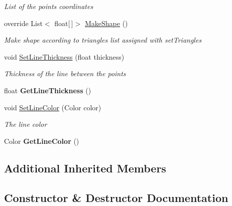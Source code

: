 \begin{DoxyCompactItemize}
\begin{DoxyCompactList}\small\item\em List of the points coordinates \end{DoxyCompactList}\item 
override List$<$ float\mbox{[}$\,$\mbox{]}$>$ \mbox{\hyperlink{class_space_v_i_l_1_1_points_container_a7fd8cf39e463780c871d538b884a3fdb}{Make\+Shape}} ()
\begin{DoxyCompactList}\small\item\em Make shape according to triangles list assigned with set\+Triangles \end{DoxyCompactList}\item 
void \mbox{\hyperlink{class_space_v_i_l_1_1_points_container_a451c8c1e3a88e205d777e7a4cfe46f97}{Set\+Line\+Thickness}} (float thickness)
\begin{DoxyCompactList}\small\item\em Thickness of the line between the points \end{DoxyCompactList}\item 
\mbox{\label{class_space_v_i_l_1_1_points_container_ac0de00bb61b2f72b9c5c45499cfc7ff8}} 
float {\bfseries Get\+Line\+Thickness} ()
\item 
void \mbox{\hyperlink{class_space_v_i_l_1_1_points_container_a8e72d762905dd7f4a8d27863a36be99c}{Set\+Line\+Color}} (Color color)
\begin{DoxyCompactList}\small\item\em The line color \end{DoxyCompactList}\item 
\mbox{\label{class_space_v_i_l_1_1_points_container_a588fa56f99bee63af3b0262787577ac1}} 
Color {\bfseries Get\+Line\+Color} ()
\end{DoxyCompactItemize}
\subsection*{Additional Inherited Members}


\subsection{Constructor \& Destructor Documentation}
\mbox{\label{class_space_v_i_l_1_1_points_container_ac769a83ca0591540c776169c376446a3}} 
